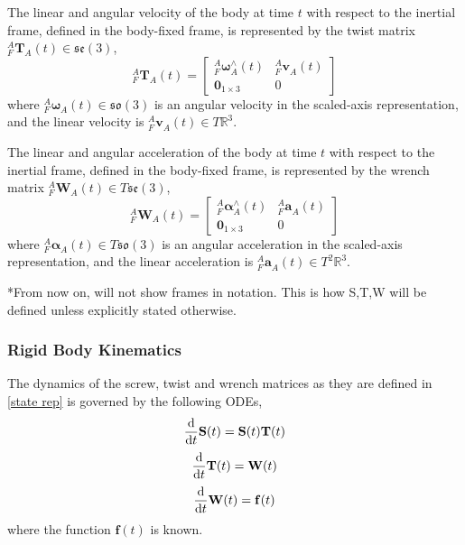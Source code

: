 		The linear and angular velocity of the body at time $t$ with respect to the inertial frame, defined in the body-fixed frame, is represented by the twist matrix ${^{A}_{F}\mathbf{T}^{}_{A}(t)} \in \mathfrak{se}(3)$,
		\begin{equation}
				{^{A}_{F}\mathbf{T}^{}_{A}(t)} = 
				\begin{bmatrix}
		  {^{A}_{F}\bm{\omega}^{\wedge}_{A}}(t) 	& 	^{A}_{F}\mathbf{v}^{}_{A}(t)\\
		  \textbf{0}_{1 \times 3} & 0						  
				\end{bmatrix}
		\end{equation}
		where $^{A}_{F}\mathbf{\omega}^{}_{A}(t) \in \mathfrak{so}(3)$ is an angular velocity in the scaled-axis representation, and the linear velocity is $^{A}_{F}\mathbf{v}^{}_{A}(t) \in T\mathbb{R}^3$.
				
		The linear and angular acceleration of the body at time $t$ with respect to the inertial frame, defined in the body-fixed frame, is represented by the wrench matrix ${^{A}_{F}\mathbf{W}^{}_{A}(t)} \in T\mathfrak{se}(3)$,
		\begin{equation}
				{^{A}_{F}\mathbf{W}^{}_{A}(t)} = 
				\begin{bmatrix}
				  {^{A}_{F}\bm{\alpha}^{\wedge}_{A}}(t) 	& 	^{A}_{F}\mathbf{a}^{}_{A}(t)\\
				  \textbf{0}_{1 \times 3} & 0						  
				\end{bmatrix}
		\end{equation}
		where $^{A}_{F}\mathbf{\alpha}^{}_{A}(t) \in  T\mathfrak{so}(3)$ is an angular acceleration in the scaled-axis representation, and the linear acceleration is $^{A}_{F}\mathbf{a}^{}_{A}(t) \in T^2\mathbb{R}^3$.
						
		*From now on, will not show frames in notation. This is how S,T,W will be defined unless explicitly stated otherwise.
						
	\subsubsection{Rigid Body Kinematics} \label{kinematics}
		The dynamics of the screw, twist and wrench matrices as they are defined in \ref{state rep} is governed by the following ODEs,
		\begin{equation}
			{\frac{\textnormal{d}}{\textnormal{d}t}} \mathbf{S}(t) =\mathbf{S}(t)\mathbf{T}(t)
		\end{equation}		
		\begin{equation}
			{\frac{\textnormal{d}}{\textnormal{d}t}} \mathbf{T}(t) = \mathbf{W}(t)
		\end{equation}		
		\begin{equation}
			{\frac{\textnormal{d}}{\textnormal{d}t}} \mathbf{W}(t)=\mathbf{f}(t)			
		\end{equation}
		where the function $\mathbf{f}(t)$ is known.
		
